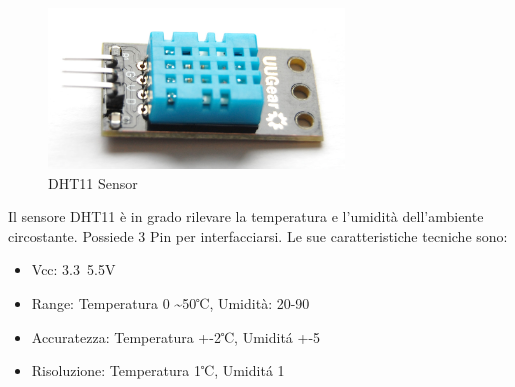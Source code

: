 \begin{figure}
\centering
\includegraphics[width=0.7\textwidth,natwidth=933,natheight=506]{Figures/Sensors&Rasp/dht11.png}
\caption[dht11]{DHT11 Sensor}
\label{fig:dht11}
\end{figure}

 Il sensore DHT11 è in grado rilevare la temperatura e l'umidità dell'ambiente circostante. Possiede 3 Pin per interfacciarsi.
 Le sue caratteristiche tecniche sono:

 \begin{itemize}
 	\item Vcc: 3.3~5.5V
 	\item Range: Temperatura 0 \textasciitilde 50℃, Umidità:  20-90%
 	\item Accuratezza: Temperatura +-2℃, Umidit\'a +-5%
 	\item Risoluzione: Temperatura  1℃, Umidit\'a  1%
 \end{itemize}




